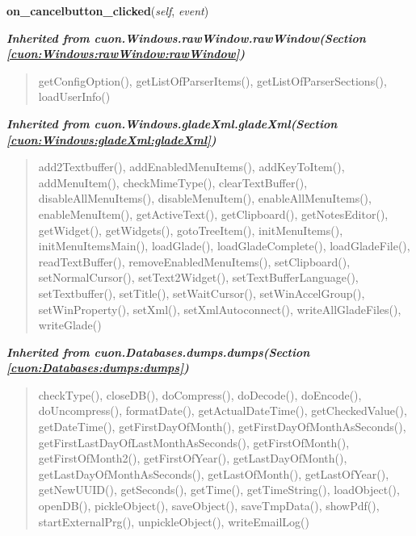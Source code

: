     \label{cuon:Addresses:lists_addresses_phone12:lists_addresses_phone12:on_cancelbutton_clicked}

    \vspace{0.5ex}

\hspace{.8\funcindent}\begin{boxedminipage}{\funcwidth}

    \raggedright \textbf{on\_cancelbutton\_clicked}(\textit{self}, \textit{event})

\setlength{\parskip}{2ex}
\setlength{\parskip}{1ex}
    \end{boxedminipage}


\large{\textbf{\textit{Inherited from cuon.Windows.rawWindow.rawWindow\textit{(Section \ref{cuon:Windows:rawWindow:rawWindow})}}}}

\begin{quote}
getConfigOption(), getListOfParserItems(), getListOfParserSections(), loadUserInfo()
\end{quote}

\large{\textbf{\textit{Inherited from cuon.Windows.gladeXml.gladeXml\textit{(Section \ref{cuon:Windows:gladeXml:gladeXml})}}}}

\begin{quote}
add2Textbuffer(), addEnabledMenuItems(), addKeyToItem(), addMenuItem(), checkMimeType(), clearTextBuffer(), disableAllMenuItems(), disableMenuItem(), enableAllMenuItems(), enableMenuItem(), getActiveText(), getClipboard(), getNotesEditor(), getWidget(), getWidgets(), gotoTreeItem(), initMenuItems(), initMenuItemsMain(), loadGlade(), loadGladeComplete(), loadGladeFile(), readTextBuffer(), removeEnabledMenuItems(), setClipboard(), setNormalCursor(), setText2Widget(), setTextBufferLanguage(), setTextbuffer(), setTitle(), setWaitCursor(), setWinAccelGroup(), setWinProperty(), setXml(), setXmlAutoconnect(), writeAllGladeFiles(), writeGlade()
\end{quote}

\large{\textbf{\textit{Inherited from cuon.Databases.dumps.dumps\textit{(Section \ref{cuon:Databases:dumps:dumps})}}}}

\begin{quote}
checkType(), closeDB(), doCompress(), doDecode(), doEncode(), doUncompress(), formatDate(), getActualDateTime(), getCheckedValue(), getDateTime(), getFirstDayOfMonth(), getFirstDayOfMonthAsSeconds(), getFirstLastDayOfLastMonthAsSeconds(), getFirstOfMonth(), getFirstOfMonth2(), getFirstOfYear(), getLastDayOfMonth(), getLastDayOfMonthAsSeconds(), getLastOfMonth(), getLastOfYear(), getNewUUID(), getSeconds(), getTime(), getTimeString(), loadObject(), openDB(), pickleObject(), saveObject(), saveTmpData(), showPdf(), startExternalPrg(), unpickleObject(), writeEmailLog()
\end{quote}

